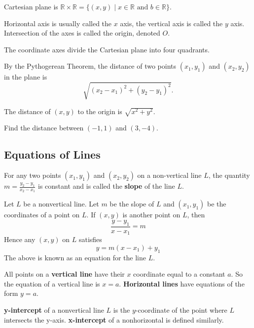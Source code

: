 \documentclass[../main.tex]{subfiles}
\begin{document}
Cartesian plane is $\mathbb{R}\times \mathbb{R} = \{(x,y) \mid x \in \mathbb{R} \text{ and } b \in \mathbb{R} \}$.

\begin{figure}[H]
  \centering
  
\end{figure}

Horizontal axis is usually called the $x$ axis, the vertical axis is called the $y$ axis. Intersection of the axes is called the origin, denoted $O$.

The coordinate axes divide the Cartesian plane into four quadrants.
\begin{figure}[H]
  \centering
  
\end{figure}

By the Pythogerean Theorem, the distance of two points $(x_1, y_1)$ and $(x_2, y_2)$ in the plane is
\[
  \sqrt{(x_2-x_1)^2 + (y_2-y_1)^2}.
\]
\begin{figure}[H]
  \centering
  
\end{figure}

The distance of $(x,y)$ to the origin is $\sqrt{x^2+y^2}$.
\begin{example}
  Find the distance between $(-1, 1)$ and $(3, -4)$.
\end{example}


\subsection*{Equations of Lines}
For any two points $(x_1, y_1)$ and $(x_2, y_2)$ on a non-vertical line $L$, the quantity $m=\frac{y_2-y_1}{x_2-x_1}$ is constant and is called the \textbf{slope} of the line $L$.

Let $L$ be a nonvertical line. Let $m$ be the slope of $L$ and $(x_1, y_1)$ be the coordinates of a point on $L$. If $(x,y)$ is another point on $L$, then
\[
  \frac{y-y_1}{x-x_1} = m
\]
Hence any $(x,y)$ on $L$ satisfies
\[
  y = m(x-x_1) + y_1
\]
The above is known as an equation for the line $L$.

All points on a \textbf{vertical line} have their $x$ coordinate equal to a constant $a$. So the equation of a vertical line is $x=a$. \textbf{Horizontal lines} have equations of the form $y=a$.

\textbf{y-intercept} of a nonvertical line $L$ is the $y$-coordinate of the point where $L$ intersects the y-axis. \textbf{x-intercept} of a nonhorizontal is defined similarly.
\end{document}
